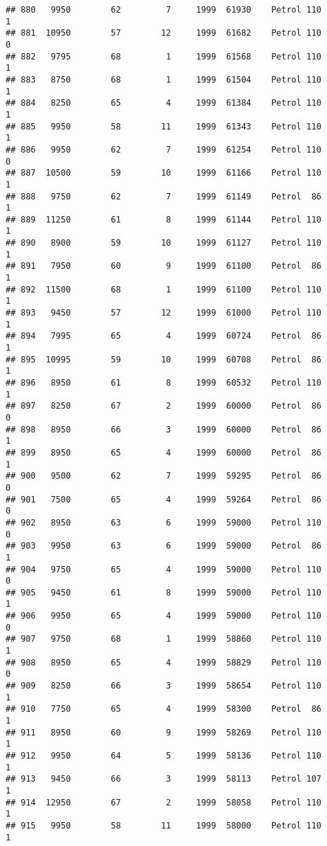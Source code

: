 \documentclass[]{article}
\begin{document}
\begin{verbatim}
## 880   9950        62         7     1999  61930    Petrol 110         1
## 881  10950        57        12     1999  61682    Petrol 110         0
## 882   9795        68         1     1999  61568    Petrol 110         1
## 883   8750        68         1     1999  61504    Petrol 110         1
## 884   8250        65         4     1999  61384    Petrol 110         1
## 885   9950        58        11     1999  61343    Petrol 110         1
## 886   9950        62         7     1999  61254    Petrol 110         0
## 887  10500        59        10     1999  61166    Petrol 110         1
## 888   9750        62         7     1999  61149    Petrol  86         1
## 889  11250        61         8     1999  61144    Petrol 110         1
## 890   8900        59        10     1999  61127    Petrol 110         1
## 891   7950        60         9     1999  61100    Petrol  86         1
## 892  11500        68         1     1999  61100    Petrol 110         1
## 893   9450        57        12     1999  61000    Petrol 110         1
## 894   7995        65         4     1999  60724    Petrol  86         1
## 895  10995        59        10     1999  60708    Petrol  86         1
## 896   8950        61         8     1999  60532    Petrol 110         1
## 897   8250        67         2     1999  60000    Petrol  86         0
## 898   8950        66         3     1999  60000    Petrol  86         1
## 899   8950        65         4     1999  60000    Petrol  86         1
## 900   9500        62         7     1999  59295    Petrol  86         0
## 901   7500        65         4     1999  59264    Petrol  86         0
## 902   8950        63         6     1999  59000    Petrol 110         0
## 903   9950        63         6     1999  59000    Petrol  86         1
## 904   9750        65         4     1999  59000    Petrol 110         0
## 905   9450        61         8     1999  59000    Petrol 110         1
## 906   9950        65         4     1999  59000    Petrol 110         0
## 907   9750        68         1     1999  58860    Petrol 110         1
## 908   8950        65         4     1999  58829    Petrol 110         0
## 909   8250        66         3     1999  58654    Petrol 110         1
## 910   7750        65         4     1999  58300    Petrol  86         1
## 911   8950        60         9     1999  58269    Petrol 110         1
## 912   9950        64         5     1999  58136    Petrol 110         1
## 913   9450        66         3     1999  58113    Petrol 107         1
## 914  12950        67         2     1999  58058    Petrol 110         1
## 915   9950        58        11     1999  58000    Petrol 110         1

\end{verbatim}
\end{document}
